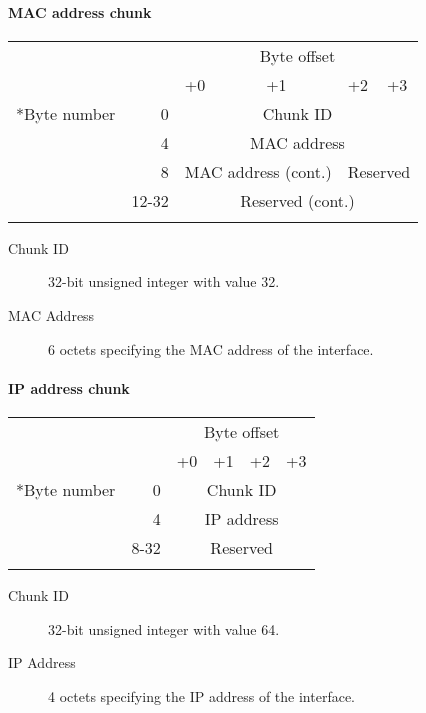 \documentclass[a4paper,12pt]{report}
\begin{document}
\paragraph{MAC address chunk}
\begin{center}
\begin{tabular}{r r | m{1in} | m{1in} | m{1in} | m{1in} |}
 & & \multicolumn{4}{c}{Byte offset} \\
 & & +0 & +1 & +2 & +3 \\
\hhline{~-----}
\multirow{4}*{Byte number} & 0 & \multicolumn{4}{c|}{Chunk ID} \\
\hhline{~~----}
 & 4 & \multicolumn{4}{c|}{MAC address} \\
\hhline{~~----}
 & 8 & \multicolumn{2}{c|}{MAC address (cont.)} & \multicolumn{2}{c|}{Reserved} \\
\hhline{~~----}
 & 12-32 & \multicolumn{4}{c|}{Reserved (cont.)} \\
\hhline{~~----}
\end{tabular}
\end{center}
\begin{description}
\item[Chunk ID]  32-bit unsigned integer with value 32.
\item[MAC Address]  6 octets specifying the MAC address of the interface.
\end{description}

\paragraph{IP address chunk}
\begin{center}
\begin{tabular}{r r | m{1in} | m{1in} | m{1in} | m{1in} |}
 & & \multicolumn{4}{c}{Byte offset} \\
 & & +0 & +1 & +2 & +3 \\
\hhline{~-----}
\multirow{3}*{Byte number} & 0 & \multicolumn{4}{c|}{Chunk ID} \\
\hhline{~~----}
 & 4 & \multicolumn{4}{c|}{IP address} \\
\hhline{~~----}
 & 8-32 & \multicolumn{4}{c|}{Reserved} \\
\hhline{~~----}
\end{tabular}
\end{center}
\begin{description}
\item[Chunk ID]  32-bit unsigned integer with value 64.
\item[IP Address]  4 octets specifying the IP address of the interface.
\end{description}
\end{document}
